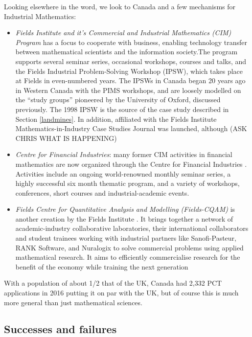 \documentclass[11pt]{article} %
\begin{document}
	Looking elsewhere in the word, we look to Canada and a few  mechanisms for Industrial Mathematics: 
	

	\begin{itemize}
		\item \textit{Fields Institute and it's Commercial and Industrial Mathematics (CIM) Program} \cite{FieldsCIM}  has a focus to cooperate with business, enabling technology transfer between mathematical scientists and the information society.The program supports several seminar series, occasional workshops, courses and talks, and the Fields Industrial Problem-Solving Workshop (IPSW), which takes place at Fields in even-numbered years. The IPSWs in Canada began 20 years ago in Western Canada with the PIMS workshops, and are loosely modelled on the “study groups” pioneered by the University of Oxford, discussed previously. The 1998 IPSW is the source of the case study described in Section \ref{landmines}.
		 In addition, affiliated with  the Fields Institute Mathematics-in-Industry Case Studies Journal was launched, although (ASK CHRIS WHAT IS HAPPENING) 
		\item \textit{Centre for Financial Industries}: many former CIM activities in financial mathematics are now organized through the Centre for Financial Industries \cite{FieldsCFI}. Activities include an ongoing world-renowned monthly seminar series, a highly successful six month thematic program, and a variety of workshops, conferences, short courses and industrial-academic events. 
		\item \textit{Fields Centre for Quantitative Analysis and Modelling (Fields-CQAM)} is another creation by the Fields Institute \cite{CQAM}. It brings together a network of academic-industry collaborative laboratories, their international collaborators and  student trainees working   with industrial partners like Sanofi-Pasteur, RANK Software, and Nuralogix to solve commercial problems using applied mathematical research. It aims to efficiently commercialise research for the benefit of the economy while training the next generation 
	\end{itemize}
	

	
With a population of about 1/2 that of the UK, Canada had 2,332 PCT applications in 2016 \cite{WIPO} putting it on par with the UK, but of course this is much more general than just mathematical sciences.

	\subsection{Successes and failures}
	
\end{document}

